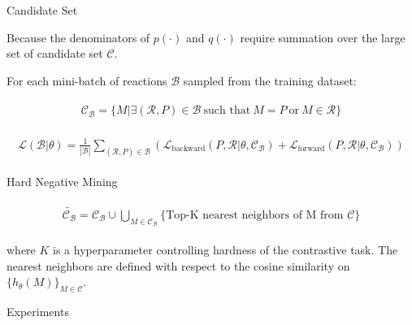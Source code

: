 \documentclass{beamer}		%
\begin{document}
\begin{frame}{Candidate Set}

Because the denominators of $p(\cdot)$ and $q(\cdot)$ require summation over the large set of candidate set $\mathcal{C}$. 

For each mini-batch of reactions $\mathcal{B}$ sampled from the training dataset:

\begin{eqnarray*}
\begin{aligned}
\mathcal{C}_{\mathcal{B}} = \{M| \exists (\mathcal{R}, P) \in \mathcal{B} \ \text{such that} \ M=P \ \text{or} \ M \in \mathcal{R}\}
\end{aligned}    
\end{eqnarray*}

\begin{eqnarray*}
\begin{aligned}
\mathcal{L}(\mathcal{B}|\theta) = \frac{1}{|\mathcal{B}|} \sum_{(\mathcal{R}, P) \in \mathcal{B}} \left(\mathcal{L}_{\text{backward}}(P, \mathcal{R}|\theta, \mathcal{C}_{\mathcal{B}}) + \mathcal{L}_{\text{forward}}(P, \mathcal{R}|\theta, \mathcal{C}_{\mathcal{B}})  \right)
\end{aligned}    
\end{eqnarray*}



\end{frame}


\begin{frame}{Hard Negative Mining}

\begin{eqnarray*}
\begin{aligned}
\tilde{\mathcal{C_B}} = \mathcal{C_B} \cup \bigcup_{M\in \mathcal{C_B}} \{\text{Top-K nearest neighbors of M from } \mathcal{C}\}
\end{aligned}    
\end{eqnarray*}

where $K$ is a hyperparameter controlling hardness of the contrastive task. The nearest neighbors are defined with respect to the cosine similarity on $\{h_\theta(M)\}_{M\in\mathcal{C}}$.

\end{frame}



\begin{frame}[noframenumbering]
\begin{itemize}
    \begin{LARGE}
    \item {}
    \item {}
    \item {}
    \item Experiments
    \end{LARGE}
\end{itemize}
\end{frame}
\end{document}
